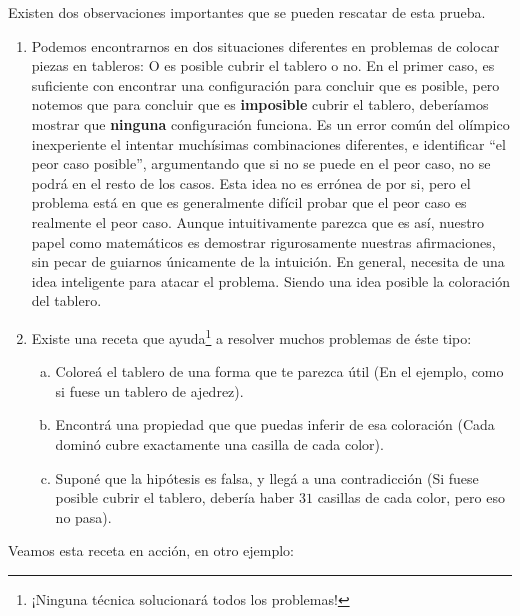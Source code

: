 Existen dos observaciones importantes que se pueden rescatar de esta prueba. 
\begin{enumerate}
	\item Podemos encontrarnos en dos situaciones diferentes en problemas de colocar piezas en tableros: O es posible cubrir el tablero o no. En el primer caso, es suficiente con encontrar una configuraci\'on para concluir que es posible, pero notemos que para concluir que es \textbf{imposible} cubrir el tablero, deber\'iamos mostrar que \textbf{ninguna} configuraci\'on funciona. Es un error com\'un del ol\'impico inexperiente el intentar much\'isimas combinaciones diferentes, e identificar ``el peor caso posible'', argumentando que si no se puede en el peor caso, no se podr\'a en el resto de los casos. Esta idea no es err\'onea de por si, pero el problema est\'a en que es generalmente dif\'icil probar que el peor caso es realmente el peor caso. Aunque intuitivamente parezca que es as\'i, nuestro papel como matem\'aticos es demostrar rigurosamente nuestras afirmaciones, sin pecar de guiarnos \'unicamente de la intuici\'on. En general, necesita de una idea inteligente para atacar el problema. Siendo una idea posible la coloraci\'on del tablero.
	\item Existe una receta que ayuda\footnote{¡Ninguna t\'ecnica solucionar\'a todos los problemas!} a resolver muchos problemas de \'este tipo:
	\begin{enumerate}[a.]
		\item Colore\'a el tablero de una forma que te parezca \'util (En el ejemplo, como si fuese un tablero de ajedrez). %
		\item Encontr\'a una propiedad que que puedas inferir de esa coloraci\'on (Cada domin\'o cubre exactamente una casilla de cada color). 
		\item Supon\'e que la hip\'otesis es falsa, y lleg\'a a una contradicci\'on (Si fuese posible cubrir el tablero, deber\'ia haber $31$ casillas de cada color, pero eso no pasa).
	\end{enumerate}

	
	
\end{enumerate}

Veamos esta receta en acci\'on, en otro ejemplo:

